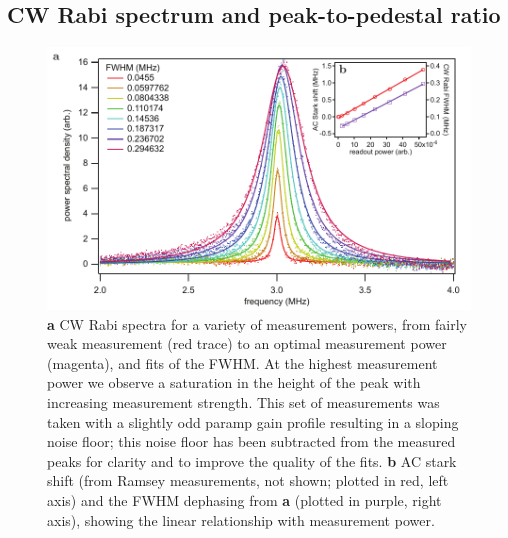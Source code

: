 \subsection{CW Rabi spectrum and peak-to-pedestal ratio}

\begin{figure}
\begin{center}
	\includegraphics[width = 6in]{qfb_results_chapter/cw_rabi_and_gamma}
\end{center}
\caption[CW Rabi spectra and fits]{\textbf{a} CW Rabi spectra for a variety of measurement powers, from fairly weak measurement (red trace) to an optimal measurement power (magenta), and fits of the FWHM.  At the highest measurement power we observe a saturation in the height of the peak with increasing measurement strength.  This set of measurements was taken with a slightly odd paramp gain profile resulting in a sloping noise floor; this noise floor has been subtracted from the measured peaks for clarity and to improve the quality of the fits.  \textbf{b} AC stark shift (from Ramsey measurements, not shown; plotted in red, left axis) and the FWHM dephasing from \textbf{a} (plotted in purple, right axis), showing the linear relationship with measurement power.}
\label{fig:cw_rabi_and_gamma}
\end{figure}

